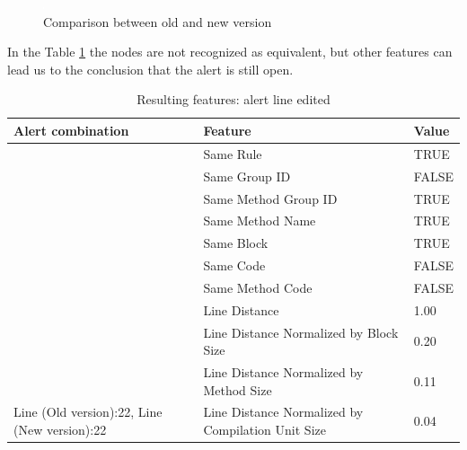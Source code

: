 \documentclass[
]{article}
\begin{document}
\begin{landscape}
\normalsize

\begin{figure}
\centering
\includegraphics{figures/fake.png}
\caption{Comparison between old and new version
\label{comparison_editing_line}}
\end{figure}

\end{landscape}

\newpage

In the Table \ref{editing_line} the nodes are not recognized as
equivalent, but other features can lead us to the conclusion that the
alert is still open.

\small

\begin{table}[!h]

\caption{\label{tab:unnamed-chunk-16}Resulting features: alert line edited \label{editing_line} }
\centering
\begin{tabular}[t]{l|l|l}
\hline
Alert combination & Feature & Value\\
\hline
\rowcolor{gray!6}   & Same Rule & TRUE\\

 & Same Group ID & FALSE\\

\rowcolor{gray!6}   & Same Method Group ID & TRUE\\

 & Same Method Name & TRUE\\

\rowcolor{gray!6}   & Same Block & TRUE\\

 & Same Code & FALSE\\

\rowcolor{gray!6}   & Same Method Code & FALSE\\

 & Line Distance & 1.00\\

\rowcolor{gray!6}   & Line Distance Normalized by Block Size & 0.20\\

 & Line Distance Normalized by Method Size & 0.11\\

\multirow[t]{-11}{*}{\raggedright\arraybackslash Line (Old version):22, Line (New version):22} & Line Distance Normalized by Compilation Unit Size & 0.04\\
\hline
\end{tabular}
\end{table}
\end{document}
